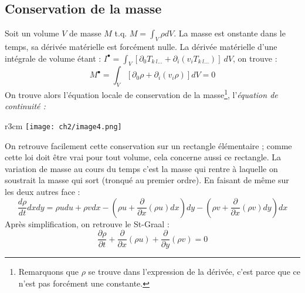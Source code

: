    \subsection{Conservation de la masse} 
    Soit un volume $V$ de masse $M$ t.q. $M = \int_V \rho dV$. La masse est onstante dans le temps, sa 
    dérivée matérielle est forcément nulle. La dérivée matérielle d'une intégrale de volume étant : $I^
    \bullet = \int_V [\partial_0T_{k\ l\dots} + \partial_i(v_iT_{k\ l\dots})]\ dV$, on trouve :
    \begin{equation}
    M^\bullet = \int_V [\partial_0\rho + \partial_i(v_i\rho)]dV = 0
    \end{equation}
    On trouve alors l'équation locale de conservation de la masse\footnote{Remarquons que $\rho$ se trouve
    dans l'expression de la dérivée, c'est parce que ce n'est pas forcément une constante.}, l'\textit{équation 
    de continuité :}
    \ \\
    \begin{wrapfigure}[8]{r}{3cm}
    \texttt{[image: ch2/image4.png]}
    \end{wrapfigure}
    On retrouve facilement cette conservation sur un rectangle élémentaire ; comme cette loi doit être vrai
    pour tout volume, cela concerne aussi ce rectangle. La variation de masse au cours du temps c'est la masse qui
    rentre à laquelle on soustrait la masse qui sort (tronqué au premier ordre). En faisant de même sur les
    deux autres face :
    \begin{equation}
    \frac{d\rho}{dt}dxdy = \rho u du + \rho v dx - \left( \rho u + \frac{\partial}{\partial x}(\rho u)dx\right)
    dy - \left( \rho v + \frac{\partial}{\partial x}(\rho v)dy\right)dx
    \end{equation}
    Après simplification, on retrouve le St-Graal :
    \begin{equation}
    \frac{\partial \rho}{\partial t} + \frac{\partial}{\partial x}(\rho u) + \frac{\partial}{\partial y}(\rho v) = 0
    \end{equation}
    
